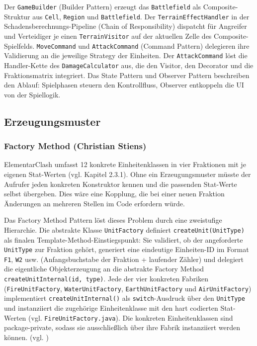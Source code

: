 Der \texttt{GameBuilder} (Builder Pattern) erzeugt das \texttt{Battlefield} als Composite-Struktur aus \texttt{Cell},
\texttt{Region} und \texttt{Battlefield}.
Der \texttt{TerrainEffectHandler} in der Schadensberechnungs-Pipeline (Chain of Responsibility) dispatcht für Angreifer
und Verteidiger je einen \texttt{TerrainVisitor} auf der aktuellen Zelle des Composite-Spielfelds.
\texttt{MoveCommand} und \texttt{AttackCommand} (Command Pattern) delegieren ihre Validierung an die jeweilige Strategy der Einheiten.
Der \texttt{AttackCommand} löst die Handler-Kette des \texttt{DamageCalculator} aus, die den Visitor, den Decorator und die Fraktionsmatrix integriert.
Das State Pattern und Observer Pattern beschreiben den Ablauf: Spielphasen steuern den Kontrollfluss, Observer entkoppeln die UI von der Spiellogik.

\subsection{Erzeugungsmuster}
\label{sec:erzeugungsmuster}

\subsubsection{Factory Method (Christian Stiens)}
\label{subsec:factory-method}
ElementarClash umfasst 12 konkrete Einheitenklassen in vier Fraktionen mit je eigenen Stat-Werten (vgl. Kapitel 2.3.1).
Ohne ein Erzeugungsmuster müsste der Aufrufer jeden konkreten Konstruktor kennen und die passenden Stat-Werte selbst übergeben.
Dies wäre eine Kopplung, die bei einer neuen Fraktion Änderungen an mehreren Stellen im Code erfordern würde.

Das Factory Method Pattern löst dieses Problem durch eine zweistufige Hierarchie.
Die abstrakte Klasse \texttt{UnitFactory} definiert \texttt{createUnit(UnitType)} als finalen Template-Method-Einstiegspunkt: Sie validiert, ob der angeforderte \texttt{UnitType} zur Fraktion gehört, generiert eine eindeutige Einheiten-ID im Format \texttt{F1}, \texttt{W2} usw. (Anfangsbuchstabe der Fraktion + laufender Zähler) und delegiert die eigentliche Objekterzeugung an die abstrakte Factory Method \texttt{createUnitInternal(id, type)}.
Jede der vier konkreten Fabriken (\texttt{FireUnitFactory}, \texttt{WaterUnitFactory}, \texttt{EarthUnitFactory} und \texttt{AirUnitFactory}) implementiert \texttt{createUnitInternal()} als \texttt{switch}-Ausdruck über den \texttt{UnitType} und instanziiert die zugehörige Einheitenklasse mit den hart codierten Stat-Werten (vgl. \texttt{FireUnitFactory.java}).
Die konkreten Einheitenklassen sind package-private, sodass sie ausschließlich über ihre Fabrik instanziiert werden können. (vgl. \cite{entwurfsmuster})

